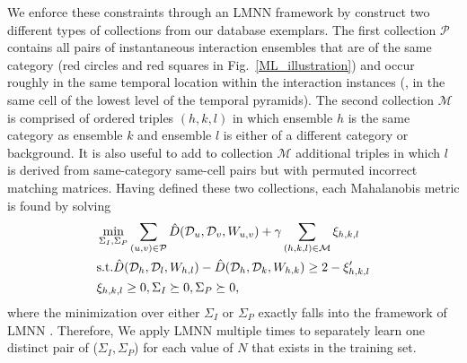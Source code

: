 We enforce these constraints through an LMNN framework by construct two different types of collections from our database exemplars. The first collection $\mathcal{P}$ contains all pairs of instantaneous interaction ensembles that are of the same category (red circles and red squares in Fig.~\ref{ML_illustration}) and occur roughly in the same temporal location within the interaction instances (\ie, in the same cell of the lowest level of the temporal pyramids). The second collection $\mathcal{M}$ is comprised of ordered triples $(h,k,l)$ in which ensemble $h$ is the same category as ensemble $k$ and ensemble $l$ is either of a different category or background. It is also useful to add to collection $\mathcal{M}$ additional triples in which $l$ is derived from same-category same-cell pairs but with permuted incorrect matching matrices. Having defined these two collections, each Mahalanobis metric is found by solving
\begin{equation}
\label{classify}
\begin{split}
&\min_{\Sigma_{I}, \Sigma_{P}} \sum_{(u,v)\in\mathcal{P}}\hat{D}(\mathcal{D}_{u}, \mathcal{D}_{v}, W_{u,v})+\gamma\sum_{(h,k,l)\in\mathcal{M}}\xi_{h,k,l}\\
&\textup{s.t.}  \hat{D}(\mathcal{D}_{h}, \mathcal{D}_{l}, W_{h,l})-\hat{D}(\mathcal{D}_{h}, \mathcal{D}_{k}, W_{h,k})\ge 2-\xi_{h,k,l}'\\
&\xi_{h,k,l}\ge0, \Sigma_{I}\succeq 0, \Sigma_{P}\succeq 0,
\end{split}
\end{equation}
where the minimization over either $\Sigma_{I}$ or $\Sigma_{P}$ exactly falls into the framework of LMNN \cite{Weinberger:ML}. Therefore, We apply LMNN multiple times to separately learn one distinct pair of ($\Sigma_{I}, \Sigma_{P}$) for each value of $N$ that exists in the training set. 


